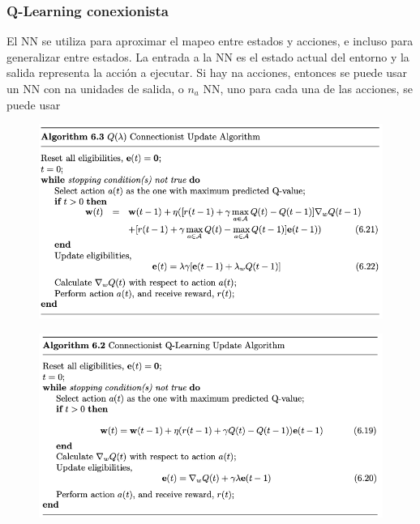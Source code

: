 \documentclass[
	11pt, %
]{beamer}
\begin{document}
\begin{frame}
  \frametitle{Q-Learning conexionista}

  El NN se utiliza para aproximar el mapeo entre estados y acciones, e incluso para generalizar entre estados. La entrada a la NN es el estado actual del entorno y la salida representa la acción a ejecutar. Si hay na acciones, entonces se puede usar un NN con na unidades de salida, o $n_a$ NN, uno para cada una de las acciones, se puede usar
  
\end{frame}

\begin{frame}
  \begin{figure}
    \includegraphics[width=0.98\linewidth]{connectionist_q.png}
  \end{figure}
\end{frame}

\begin{frame}
  \begin{figure}
    \includegraphics[width=0.98\linewidth]{connectionist_update.png}
  \end{figure}
\end{frame}

\end{document}
